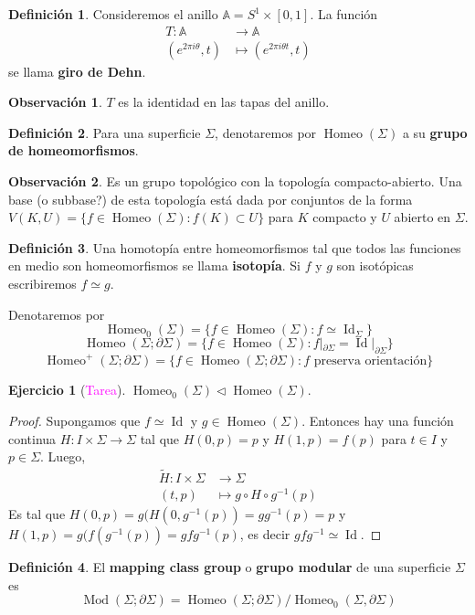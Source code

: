 \documentclass[spanish]{article}
\theoremstyle{definition}
\newtheorem*{defn}{Definición}
\newtheorem*{obs}{Observación}
\newtheorem*{ejer}{Ejercicio}
\newcommand{\A}{\mathbb{A}}
\DeclareMathOperator{\Id}{Id}
\DeclareMathOperator{\Mod}{Mod}
\DeclareMathOperator{\Homeo}{Homeo}
\begin{document}
\begin{defn}
	Consideremos el anillo $\A=S^1\times [0,1]$. La función
	\begin{align*}
		T:\A&\to\A\\
		(e^{2\pi i\theta},t)&\mapsto(e^{2\pi i\theta t},t)
	\end{align*}
	se llama \textbf{giro de Dehn}.
\end{defn}
\begin{obs}
	$T$ es la identidad en las tapas del anillo.
\end{obs}
\begin{defn}
	Para una superficie $\Sigma$, denotaremos por $\Homeo(\Sigma)$ a su \textbf{grupo de homeomorfismos}.
\end{defn}
\begin{obs}
	Es un grupo topológico con la topología compacto-abierto. Una base (o subbase?) de esta topología está dada por conjuntos de la forma $V(K,U)=\{f\in\Homeo(\Sigma):f(K)\subset U\}$ para $K$ compacto y $U$ abierto en $\Sigma$.
\end{obs}
\begin{defn}
		Una homotopía entre homeomorfismos tal que todos las funciones en medio son homeomorfismos se llama \textbf{isotopía}. Si $f$ y $g$ son isotópicas escribiremos $f\simeq g$.
\end{defn}
	Denotaremos por \[\Homeo_0(\Sigma)=\{f\in\Homeo(\Sigma):f\simeq\Id_\Sigma\}\]
	\[\Homeo(\Sigma;\partial\Sigma)=\{f\in\Homeo(\Sigma):f|_{\partial\Sigma}=\Id|_{\partial\Sigma}\}\]
	\[\Homeo^+(\Sigma;\partial\Sigma)=\{f\in\Homeo(\Sigma;\partial\Sigma):f\text{ preserva orientación}\}\]
	\begin{ejer}[\textcolor{magenta}{Tarea}]
		$\Homeo_0(\Sigma)\triangleleft\Homeo(\Sigma)$.
	\end{ejer}
	\begin{proof}
		Supongamos que $f\simeq\Id$ y $g\in\Homeo(\Sigma)$. Entonces hay una función continua $H:I\times\Sigma\to\Sigma$ tal que $H(0,p)=p$ y $H(1,p)=f(p)$ para $t\in I$ y $p\in\Sigma$. Luego,
		\begin{align*}
			\tilde{H}:I\times\Sigma&\to\Sigma\\
			(t,p)&\mapsto g\circ H\circ g^{-1}(p)
		\end{align*}
		Es tal que $H(0,p)=g(H(0,g^{-1}(p))=gg^{-1}(p)=p$ y $H(1,p)=g(f(g^{-1}(p))=gfg^{-1}(p)$, es decir $gfg^{-1}\simeq\Id$.
		\end{proof}
	\begin{defn}
		El \textbf{mapping class group} o \textbf{grupo modular} de una superficie $\Sigma$ es 
		\[\Mod(\Sigma;\partial\Sigma)=\Homeo(\Sigma;\partial\Sigma)\Big/\Homeo_0(\Sigma,\partial\Sigma)\]
	\end{defn}
\end{document}
